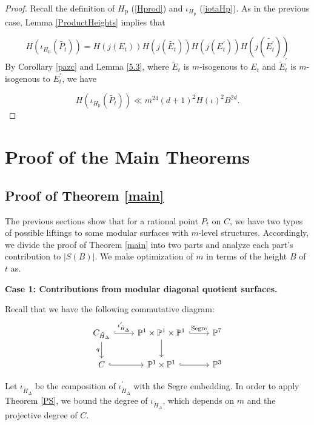 \documentclass[12pt]{amsart}
\theoremstyle{definition}
\theoremstyle{remark}
\numberwithin{equation}{section}
\renewcommand{\P}{\mathbb{P}}
\begin{document}
\begin{proof}
Recall the definition of $H_{\operatorname{p}}$ (\ref{Hprod}) and $\iota_{H_{\operatorname{p}}}$ (\ref{iotaHp}). As in the previous case, Lemma \ref{ProductHeights} implies that 
 
 $$H(\iota_{H_{\operatorname{p}}}(\tilde{P_{t}}))=H(j(E_{t}))H(j(\tilde{E_{t}}))H(j(E_{t}^{\prime}))H(j(\tilde{E_{t}^{\prime}}))$$
 By Corollary \ref{pazc} and Lemma \ref{5.3}, where $\tilde{E}_{t}$ is $m$-isogenous to $E_{t}$ and $\tilde{E}^{\prime}_{t}$ is $m$-isogenous to $E_{t}^{\prime}$, we have 

$$H(\iota_{H_{\operatorname{p}}}(\tilde{P_{t}})) \ll m^{24}(d+1)^{2}H(\iota)^{2}B^{2d} .$$
 
		
\end{proof}

\section{Proof of the Main Theorems}
 \subsection{Proof of Theorem \ref{main}}
The previous sections show that for a rational point $P_{t}$ on $C$, we have two types of possible liftings to some modular surfaces with $m$-level structures. Accordingly, we divide the proof of Theorem \ref{main} into two parts and analyze each part's contribution to $\vert  S(B)\vert $. We make optimization of $m$ in terms of the height $B$ of $t$ as. 


\textbf{Case 1: Contributions from modular diagonal quotient surfaces. }

Recall that we have the following commutative diagram: 
		$$\begin{tikzcd}
   C_{\tilde{H}_{\Delta}}  \arrow[r, hook, "\iota_{\tilde{H}_{\Delta}}^{\prime}"] \arrow[d, "q", swap] & \P^{1} \times \P^{1} \times \P^{1}  \arrow[r, hook, "\text{Segre}"] \arrow[d] & \P^{7}  \\
C \arrow[r, hook] & \P^{1} \times \P^{1} \arrow[r, hook] & \P^{3}  	
\end{tikzcd}$$

Let $\iota_{\tilde{H}_{\Delta}}$ be the composition of $\iota^{\prime}_{\tilde{H}_{\Delta}}$ with the Segre embedding. In order to apply Theorem \ref{PS}, we bound the degree of $\iota_{\tilde{H}_{\Delta}}$, which depends on $m$ and the projective degree of $C$.
\end{document}
